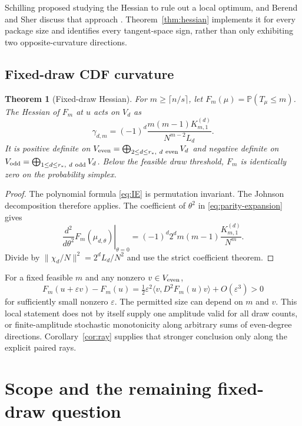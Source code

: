 \documentclass[11pt]{article}
\numberwithin{equation}{section}
\newtheorem{theorem}{Theorem}[section]
\theoremstyle{remark}
\newcommand{\Pp}{\mathbb P}
\newcommand{\1}{\mathbf 1}
\begin{document}
Schilling proposed studying the Hessian to rule out a local optimum, and Berend and Sher discuss that approach \cite{Schilling,BerendSher}. Theorem~\ref{thm:hessian} implements it for every package size and identifies every tangent-space sign, rather than only exhibiting two opposite-curvature directions.

\subsection{Fixed-draw CDF curvature}

\begin{theorem}[Fixed-draw Hessian]\label{thm:cdf-hessian}
For $m\geq\lceil n/s\rceil$, let $F_m(\mu)=\Pp(T_\mu\leq m)$. The Hessian of $F_m$ at $u$ acts on $V_d$ as
\begin{equation}\label{eq:cdf-eigenvalue}
 \gamma_{d,m}=(-1)^d\frac{m(m-1)K^{(d)}_{m,1}}{N^{m-2}L_d}.
\end{equation}
It is positive definite on $V_{\rm even}=\bigoplus_{2\leq d\leq r_*,\ d\ {\rm even}}V_d$ and negative definite on $V_{\rm odd}=\bigoplus_{1\leq d\leq r_*,\ d\ {\rm odd}}V_d$. Below the feasible draw threshold, $F_m$ is identically zero on the probability simplex.
\end{theorem}

\begin{proof}
The polynomial formula \eqref{eq:IE} is permutation invariant. The Johnson decomposition therefore applies. The coefficient of $\theta^2$ in \eqref{eq:parity-expansion} gives
\[
 \left.\frac{d^2}{d\theta^2}F_m(\mu_{d,\theta})\right|_{\theta=0}
 =(-1)^d2^d m(m-1)\frac{K^{(d)}_{m,1}}{N^m}.
\]
Divide by $\|\chi_d/N\|^2=2^dL_d/N^2$ and use the strict coefficient theorem.
\end{proof}

For a fixed feasible $m$ and any nonzero $v\in V_{\rm even}$,
\[
 F_m(u+\varepsilon v)-F_m(u)
 =\tfrac12\varepsilon^2\langle v,D^2F_m(u)v\rangle+O(\varepsilon^3)>0
\]
for sufficiently small nonzero $\varepsilon$. The permitted size can depend on $m$ and $v$. This local statement does not by itself supply one amplitude valid for all draw counts, or finite-amplitude stochastic monotonicity along arbitrary sums of even-degree directions. Corollary~\ref{cor:ray} supplies that stronger conclusion only along the explicit paired rays.

\section{Scope and the remaining fixed-draw question}\label{sec:scope}
\end{document}
